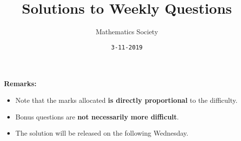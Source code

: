 \documentclass[answers]{exam}
\title{Solutions to Weekly Questions}
\author{Mathematics Society}
\date{\texttt{3-11-2019}}
\begin{document}


\maketitle


\textbf{Remarks:}
\begin{itemize}
    \item Note that the marks allocated \textbf{is directly proportional} to the difficulty.
    \item Bonus questions are \textbf{not necessarily more difficult}.
    \item The solution will be released on the following Wednesday.
\end{itemize}





\end{document}
